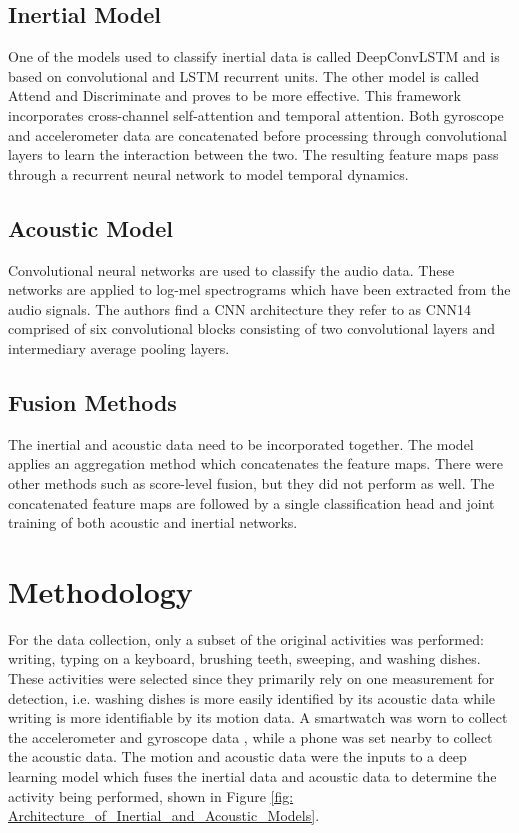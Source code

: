 \documentclass[conference]{IEEEtran}
\begin{document}
	\subsection{Inertial Model}
	One of the models used to classify inertial data is called DeepConvLSTM and is based on convolutional and LSTM recurrent units. The other model is called Attend and Discriminate and proves to be more effective. This framework incorporates cross-channel self-attention and temporal attention. Both gyroscope and accelerometer data are concatenated before processing through convolutional layers to learn the interaction between the two. The resulting feature maps pass through a recurrent neural network to model temporal dynamics.
	
	\subsection{Acoustic Model}
	Convolutional neural networks are used to classify the audio data. These networks are applied to log-mel spectrograms which have been extracted from the audio signals. The authors find a CNN architecture they refer  to as CNN14 comprised of six convolutional blocks consisting of two convolutional layers and intermediary average pooling layers.
	
	\subsection{Fusion Methods}
	The inertial and acoustic data need to be incorporated together. The model applies an aggregation method which concatenates the feature maps. There were other methods such as score-level fusion, but they did not perform as well. The concatenated feature maps are followed by a single classification head and joint training of both acoustic and inertial networks.
	
	\section{Methodology}
	For the data collection, only a subset of the original activities was performed: writing, typing on a keyboard, brushing teeth, sweeping, and washing dishes.
	These activities were selected since they primarily rely on one measurement for detection, i.e. washing dishes is more easily identified by its acoustic data while writing is more identifiable by its motion data.
	A smartwatch was worn to collect the accelerometer and gyroscope data \cite{2020_Accelerometer_and_Gyroscope}, while a phone was set nearby to collect the acoustic data.
	The motion and acoustic data were the inputs to a deep learning model which fuses the inertial data and acoustic data to determine the activity being performed, shown in Figure \ref{fig: Architecture_of_Inertial_and_Acoustic_Models}.
	
\end{document}
